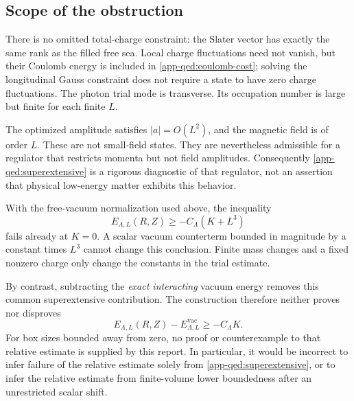 \subsection{Scope of the obstruction}
\label{app-qed:scope}

There is no omitted total-charge constraint: the Slater vector has exactly the same rank as the filled free sea. Local charge fluctuations need not vanish, but their Coulomb energy is included in \eqref{app-qed:coulomb-cost}; solving the longitudinal Gauss constraint does not require a state to have zero charge fluctuations. The photon trial mode is transverse. Its occupation number is large but finite for each finite \(L\).

The optimized amplitude satisfies \(|a|=O(L^2)\), and the magnetic field is of order \(L\). These are not small-field states. They are nevertheless admissible for a regulator that restricts momenta but not field amplitudes. Consequently \eqref{app-qed:superextensive} is a rigorous diagnostic of that regulator, not an assertion that physical low-energy matter exhibits this behavior.

With the free-vacuum normalization used above, the inequality
\[
 E_{\Lambda,L}(R,Z)\geq-C_\Lambda(K+L^3)
\]
fails already at \(K=0\). A scalar vacuum counterterm bounded in magnitude by a constant times \(L^3\) cannot change this conclusion. Finite mass changes and a fixed nonzero charge only change the constants in the trial estimate.

By contrast, subtracting the \emph{exact interacting} vacuum energy removes this common superextensive contribution. The construction therefore neither proves nor disproves
\[
 E_{\Lambda,L}(R,Z)-E^{\mathrm{vac}}_{\Lambda,L}\geq-C_\Lambda K.
\]
For box sizes bounded away from zero, no proof or counterexample to that relative estimate is supplied by this report. In particular, it would be incorrect to infer failure of the relative estimate solely from \eqref{app-qed:superextensive}, or to infer the relative estimate from finite-volume lower boundedness after an unrestricted scalar shift.
